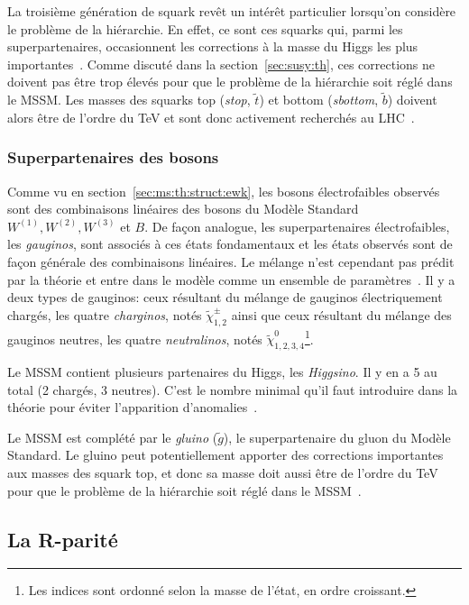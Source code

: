 La troisième génération de squark revêt un intérêt particulier
lorsqu'on considère le problème de la hiérarchie. En effet, ce sont
ces squarks qui, parmi les superpartenaires, occasionnent les
corrections à la masse du Higgs les plus
importantes~\cite{olive_susy2_2014}. Comme discuté dans la
section~\ref{sec:susy:th}, ces corrections 
ne doivent pas être trop élevés pour que le
problème de la hiérarchie soit réglé dans le MSSM. Les masses des
squarks top (\emph{stop}, $\tilde{t}$) et bottom (\emph{sbottom},
$\tilde{b}$) doivent alors être de l'ordre du TeV et sont donc
activement recherchés au LHC~\cite{ATLAS-CONF-2015-067}.

\subsubsection{Superpartenaires des bosons}
Comme vu en section~\ref{sec:ms:th:struct:ewk}, les bosons
électrofaibles observés sont des combinaisons linéaires des bosons du
Modèle Standard $W^{(1)}, W^{(2)}, W^{(3)}$ et $B$. De façon analogue,
les superpartenaires électrofaibles, les \emph{gauginos}, sont
associés à ces états fondamentaux et les états observés sont de façon
générale des combinaisons linéaires. Le mélange n'est cependant pas
prédit par la théorie et entre dans le modèle comme un ensemble de
paramètres~\cite{olive_susy1_2014}. Il y a deux types de gauginos:
ceux résultant du mélange de gauginos électriquement chargés, les
quatre \emph{charginos}, notés $\tilde{\chi}_{1,2}^\pm$ ainsi que ceux
résultant du mélange des gauginos neutres, les quatre
\emph{neutralinos}, notés $\tilde{\chi}_{1,2,3,4}^0$\footnote{Les
  indices sont ordonné selon la masse de l'état, en ordre
  croissant.}\cite{aad_summary_2015}.

Le MSSM contient plusieurs partenaires du Higgs, les
\emph{Higgsino}. Il y en a 5 au total (2 chargés, 3 neutres). C'est le
nombre minimal qu'il faut introduire dans la théorie pour éviter
l'apparition d'anomalies~\cite{olive_susy1_2014}.

Le MSSM est complété par le \emph{gluino} ($\tilde{g}$), le
superpartenaire du gluon du Modèle Standard. Le gluino peut
potentiellement apporter des corrections importantes aux masses des
squark top, et donc sa masse doit aussi être de l'ordre du TeV pour
que le problème de la hiérarchie soit réglé dans le
MSSM~\cite{ATLAS-CONF-2015-067}.

\subsection{La R-parité}
\label{sec:susy:R}

